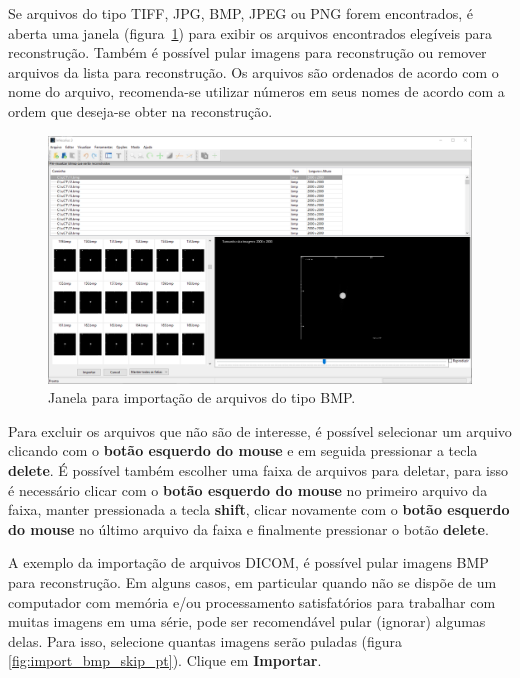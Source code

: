 Se arquivos do tipo TIFF, JPG, BMP, JPEG ou PNG  forem encontrados, é aberta uma janela (figura~\ref{fig:import_bmp_window_pt}) para exibir os arquivos encontrados elegíveis para reconstrução. Também é possível pular imagens para reconstrução ou remover arquivos da lista para reconstrução. Os arquivos são ordenados de acordo com o nome do arquivo, recomenda-se utilizar números em seus nomes de acordo com a ordem que deseja-se obter na reconstrução.

\begin{figure}[!htb]
\centering
\includegraphics[scale=0.3]{../user_guide_figures/invesalius_screen/import_bmp_window_pt.png}
\caption{Janela para importação de arquivos do tipo BMP.}
\label{fig:import_bmp_window_pt}
\end{figure}

Para excluir os arquivos que não são de interesse, é possível selecionar um arquivo clicando com o \textbf{botão esquerdo do mouse} e em seguida pressionar a tecla \textbf{delete}. É possível também escolher uma faixa de arquivos para deletar, para isso é necessário clicar com o \textbf{botão esquerdo do mouse} no primeiro arquivo da faixa, manter pressionada a tecla \textbf{shift}, clicar novamente com o \textbf{botão esquerdo do mouse} no último arquivo da faixa e finalmente pressionar o botão \textbf{delete}.
 
A exemplo da importação de arquivos DICOM, é possível pular imagens BMP para reconstrução. Em alguns casos, em particular quando não se dispõe de um computador com memória e/ou processamento satisfatórios para trabalhar com muitas imagens em uma série, pode ser recomendável pular (ignorar) algumas delas. Para isso, selecione quantas imagens serão puladas (figura \ref{fig:import_bmp_skip_pt}). Clique em \textbf{Importar}.

